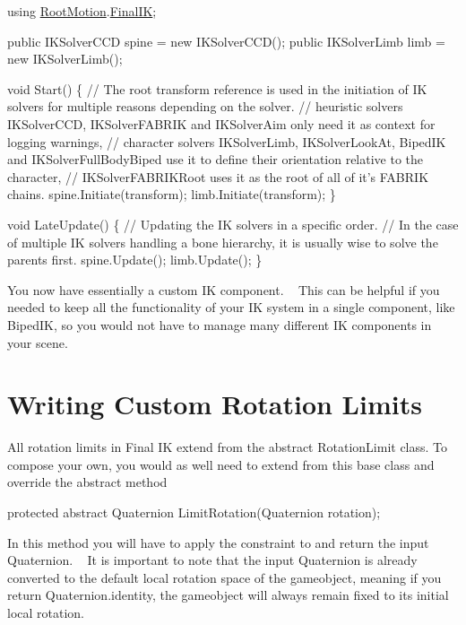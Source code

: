 \begin{DoxyCode}
\textcolor{keyword}{using} \mbox{\hyperlink{namespace_root_motion}{RootMotion}}.\mbox{\hyperlink{namespace_root_motion_1_1_final_i_k}{FinalIK}};

\textcolor{keyword}{public} IKSolverCCD spine = \textcolor{keyword}{new} IKSolverCCD();
\textcolor{keyword}{public} IKSolverLimb limb = \textcolor{keyword}{new} IKSolverLimb();

\textcolor{keywordtype}{void} Start() \{
    \textcolor{comment}{// The root transform reference is used in the initiation of IK solvers for multiple reasons depending
       on the solver.}
    \textcolor{comment}{// heuristic solvers IKSolverCCD, IKSolverFABRIK and IKSolverAim only need it as context for logging
       warnings, }
    \textcolor{comment}{// character solvers IKSolverLimb, IKSolverLookAt, BipedIK and IKSolverFullBodyBiped use it to define
       their orientation relative to the character,}
    \textcolor{comment}{// IKSolverFABRIKRoot uses it as the root of all of it's FABRIK chains.}
    spine.Initiate(transform);
    limb.Initiate(transform);
\}

\textcolor{keywordtype}{void} LateUpdate() \{
    \textcolor{comment}{// Updating the IK solvers in a specific order.}
    \textcolor{comment}{// In the case of multiple IK solvers handling a bone hierarchy, it is usually wise to solve the
       parents first.}
    spine.Update();
    limb.Update();
\}
\end{DoxyCode}
 You now have essentially a custom IK component. ~\newline
This can be helpful if you needed to keep all the functionality of your IK system in a single component, like Biped\+IK, so you would not have to manage many different IK components in your scene.\hypertarget{page13_customrotationlimits}{}\section{Writing Custom Rotation Limits}\label{page13_customrotationlimits}
All rotation limits in Final IK extend from the abstract Rotation\+Limit class. To compose your own, you would as well need to extend from this base class and override the abstract method 
\begin{DoxyCode}
\textcolor{keyword}{protected} \textcolor{keyword}{abstract} Quaternion LimitRotation(Quaternion rotation); 
\end{DoxyCode}


In this method you will have to apply the constraint to and return the input Quaternion. ~\newline
It is important to note that the input Quaternion is already converted to the default local rotation space of the gameobject, meaning if you return Quaternion.\+identity, the gameobject will always remain fixed to it\textquotesingle{}s initial local rotation.

